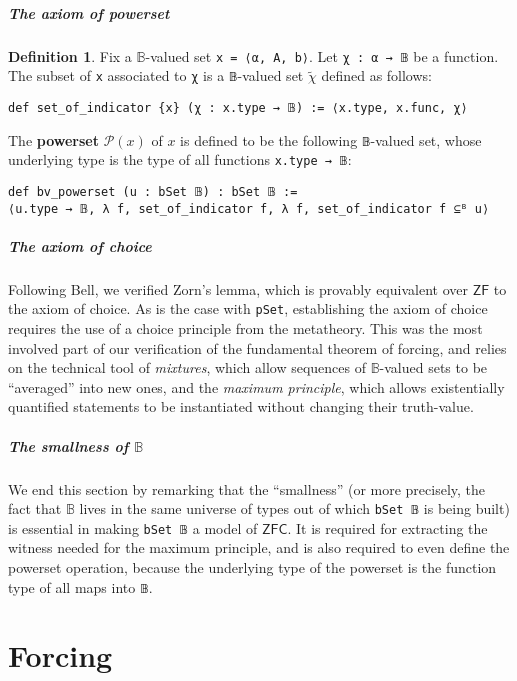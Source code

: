 \documentclass[a4paper,USenglish,cleveref, autoref]{lipics-v2019}
\newcommand{\B}{\mathbb{B}}
\newcommand{\lil}{\lstinline}
\theoremstyle{theorem}
\theoremstyle{definition}
\newtheorem{defn}[definition]{Definition}
\begin{document}
\subparagraph*{The axiom of powerset}
\begin{defn} \label{def-powerset}
  Fix a $\B$-valued set \lil{x = ⟨α, A, b⟩}. Let \lil{χ : α → 𝔹} be a function. The subset of \lil{x} associated to \lil{χ} is a \lil{𝔹}-valued set $\widetilde{\chi}$ defined as follows:
\begin{lstlisting}
def set_of_indicator {x} (χ : x.type → 𝔹) := ⟨x.type, x.func, χ⟩
\end{lstlisting}

The \textbf{powerset} $\mathcal{P}(x)$ of $x$ is defined to be the following \lil{𝔹}-valued set, whose underlying type is the type of all functions \lil{x.type → 𝔹}:
\begin{lstlisting}
def bv_powerset (u : bSet 𝔹) : bSet 𝔹 :=
⟨u.type → 𝔹, λ f, set_of_indicator f, λ f, set_of_indicator f ⊆ᴮ u⟩
\end{lstlisting}
\end{defn}

\subparagraph*{The axiom of choice}
Following Bell, we verified Zorn's lemma, which is provably equivalent over $\mathsf{ZF}$ to the axiom of choice. As is the case with \lil{pSet}, establishing the axiom of choice requires the use of a choice principle from the metatheory. This was the most involved part of our verification of the fundamental theorem of forcing, and relies on the technical tool of \emph{mixtures}, which allow sequences of $\B$-valued sets to be ``averaged'' into new ones, and the \emph{maximum principle}, which allows existentially quantified statements to be instantiated without changing their truth-value.

\subparagraph*{The smallness of $\B$}
We end this section by remarking that the ``smallness'' (or more precisely, the fact that $\B$ lives in the same universe of types out of which \lil{bSet 𝔹} is being built) is essential in making \lstinline{bSet 𝔹} a model of $\mathsf{ZFC}$. It is required for extracting the witness needed for the maximum principle, and is also required to even define the powerset operation, because the underlying type of the powerset is the function type of all maps into \lstinline{𝔹}.

\section{Forcing}
\label{sect:forcing}

\end{document}
